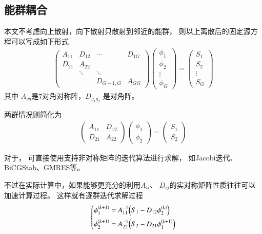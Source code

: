 \subsection{能群耦合}

本文不考虑向上散射，向下散射只散射到邻近的能群，
则以上离散后的固定源方程可以写成如下形式
\begin{align}
  \begin{pmatrix}
  A_{11} & D_{12} & \cdots & D_{1G}\\
  D_{21} & A_{22} & &\\
   & \ddots & \ddots &\\
   & & D_{G-1,G} & A_{GG}
  \end{pmatrix}
  \begin{pmatrix}
  \phi_1 \\ \phi_2 \\ \vdots \\ \phi_G
  \end{pmatrix}
  =
  \begin{pmatrix}
  S_1 \\ S_2 \\ \vdots \\ S_G
  \end{pmatrix}
\end{align}
其中 $A_{gg}$是7对角对称阵，$D_{g_1g_2}$ 是对角阵。

两群情况则简化为
\begin{align}
  \begin{pmatrix}
  A_{11} & D_{12} \\
  D_{21} & A_{22}
  \end{pmatrix}
  \begin{pmatrix}
  \phi_1 \\ \phi_2
  \end{pmatrix}
  =
  \begin{pmatrix}
  S_1 \\ S_2
  \end{pmatrix}
  \label{equ:program.group.g2equ.fixs}
\end{align}

对于，
可直接使用支持非对称矩阵的迭代算法进行求解，
如Jacobi迭代、BiCGStab、GMRES等。

不过在实际计算中，如果能够更充分的利用$A_{ii}$、
$D_{ij}$的实对称矩阵性质往往可以加速计算过程。
这样就有逐群迭代求解过程
\begin{align}
  \left\{
  \begin{aligned}
    \phi_1^{(k+1)}&=A_{11}^{-1}\pb[B]{S_1-D_{12}\phi_2^{(k)}}\\
    \phi_2^{(k+1)}&=A_{22}^{-1}\pb[B]{S_2-D_{21}\phi_1^{(k+1)}}
  \end{aligned}
  \right.
\end{align}

